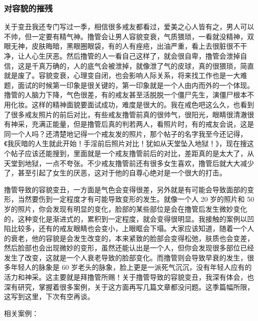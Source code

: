 \documentclass[fontset=founder]{ctexart}
\begin{document}
\subsubsection{对容貌的摧残}

关于变丑我还专门写过一季，相信很多戒友都看过，爱美之心人皆有之，男人可以不帅，但一定要有精气神。撸管会让男人容貌变衰，气质猥琐，一看就没精神，双眼无神，皮肤晦暗，黑眼圈眼袋，有的人有痤疮，出油严重，看上去很脏很不干净，让人心生厌恶。然后撸管的人一看自己这样了，就会很自卑，撸管会泄掉自信，这是千真万确的，人的底气会被泄掉，就像泄了气的皮球，真的很猥琐，简直就是废了。容貌变衰，心理变自闭，也会影响人际关系，将来找工作也是一大难题，面试的时候第一印象是很关键的，第一印象就是一个人由内而外的一个体现。撸管的人脑力下降，气色很差，有的戒友甚至活脱脱一个僵尸先生，演僵尸根本不用化妆。这样的精神面貌要面试成功，难度是很大的。我在戒色吧这么久，也看到了很多戒友照片的前后对比，有些戒友撸管前真的很帅气，很阳光，眼睛很清澈很有神采，充满正能量，但是撸管后真的判若两人，看照片时，有的戒友会说，这是同一个人吗？还清楚地记得一个戒友发的照片，那个帖子的名字我至今还记得，《我灰暗的人生就此开始！手淫前后照片对比！犹如从天堂坠入地狱！》，现在搜这个帖子应该还能搜到，里面就是一个戒友撸管前后的对比，差距真的是太大了，从天堂到地狱，一点不夸张。不少戒友撸管前还有很多女生喜欢，撸管后就大大减少了，甚至引起了女生的厌恶，这对于他的自尊心绝对是一个很大的打击。

撸管导致的容貌变丑，一方面是气色会变得很差，另外就是有可能会导致面部的变形，当然要伤到一定程度才有可能导致变形的发生。就像一个人 20 岁的照片和 50 岁的照片，你会发现有明显的变化，脸部的某些部位是会在撸管后发生微妙变化的，这种变化是渐进式的，累积到一定程度，就会变得很明显。我接触的案例以凹陷比较多，还有的戒友眼睛也会变小，上眼眶会下塌。大家应该知道，随着一个人的衰老，他的容貌是会发生改变的，本来紧致的脸部会变得松弛，肤质也会变差，然后脸部也会出现微妙的变形，虽然还能认出是一个人，但你会发现很多部位已经发生了改变，这就是一个人衰老导致的脸部变化。而撸管则会导致早衰的发生，很多年轻人的脉象是 60 岁老头的脉象，脸上更是一派死气沉沉，没有年轻人应有的活力和神采。这主要就是拜撸管所赐！关于撸管导致的容貌变丑，我深有体会，也深有研究，掌握着很多案例，关于这方面再写几篇文章都没问题。这季篇幅所限，这写到这里，下次有空再谈。

相关案例：
\end{document}
